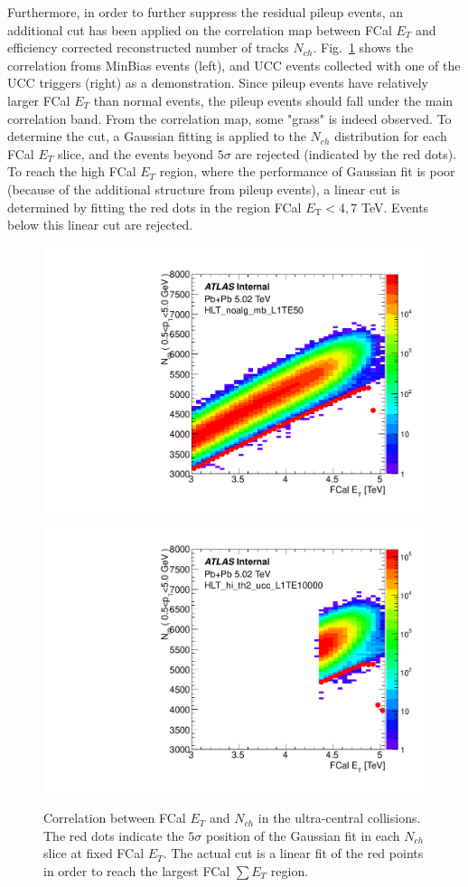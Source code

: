 Furthermore, in order to further suppress the residual pileup events, an additional cut has been applied on the correlation map between FCal $E_{T}$ and efficiency corrected reconstructed number of tracks $N_{ch}$. Fig.~\ref{fig:evtSel_addPuCut} shows the correlation froms MinBias events (left), and UCC events collected with one of the UCC triggers (right) as a demonstration. Since pileup events have relatively larger FCal $E_{T}$ than normal events, the pileup events should fall under the main correlation band. From the correlation map, some "grass" is indeed observed. To determine the cut, a Gaussian fitting is applied to the $N_{ch}$ distribution for each FCal $E_{T}$ slice, and the events beyond $5 \sigma$ are rejected (indicated by the red dots). To reach the high FCal $E_{T}$ region, where the performance of Gaussian fit is poor (because of the additional structure from pileup events), a linear cut is determined by fitting the red dots in the region FCal $E_\text{T}<4,7$ TeV. Events below this linear cut are rejected.
\begin{figure}[H]
\centering
\includegraphics[width=.45\linewidth]{figs/sec_evtSel/PbPb502/puCut_1.pdf}
\includegraphics[width=.45\linewidth]{figs/sec_evtSel/PbPb502/puCut_3.pdf}
\caption{Correlation between FCal $E_{T}$ and $N_{ch}$ in the ultra-central collisions. The red dots indicate the $5 \sigma$ position of the Gaussian fit in each $N_{ch}$ slice at fixed FCal $E_{T}$. The actual cut is a linear fit of the red points in order to reach the largest FCal $\sum E_T$ region.}
\label{fig:evtSel_addPuCut}
\end{figure}



